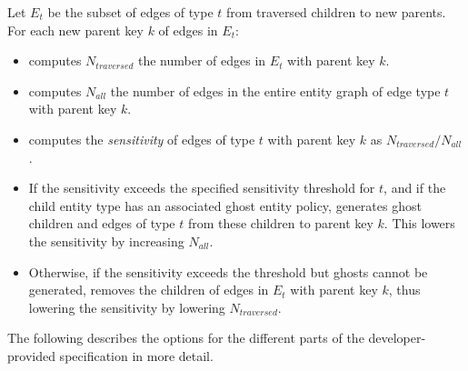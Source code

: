 \begin{enumerate}
        Let $E_t$ be the subset of
        edges of type $t$ from traversed children to new parents. For each new parent key $k$ of
        edges in $E_t$:
    \begin{itemize}
        \item \sys{} computes $N_{traversed}$ the number of edges in $E_t$ with parent key $k$.
        \item \sys{} computes $N_{all}$ the number of edges in the entire entity graph of edge
            type $t$ with parent key $k$.
        \item \sys{} computes the \emph{sensitivity} of edges of type $t$ with parent key $k$ as $N_{traversed}/N_{all}$.
    \item If the sensitivity exceeds the specified sensitivity threshold for $t$,
        and if the child entity type has an associated ghost entity policy, \sys{}
        generates ghost children and edges of type $t$ from these children to parent
        key $k$. This lowers the sensitivity by increasing $N_{all}$.
    \item Otherwise, if the sensitivity exceeds the threshold but ghosts cannot be generated,
        \sys{} removes the children of edges in $E_t$ with parent key $k$, thus lowering the
            sensitivity by lowering $N_{traversed}$.
    \end{itemize}
\end{enumerate}

\noindent The following describes the options for the different parts of the developer-provided
specification in more detail.

